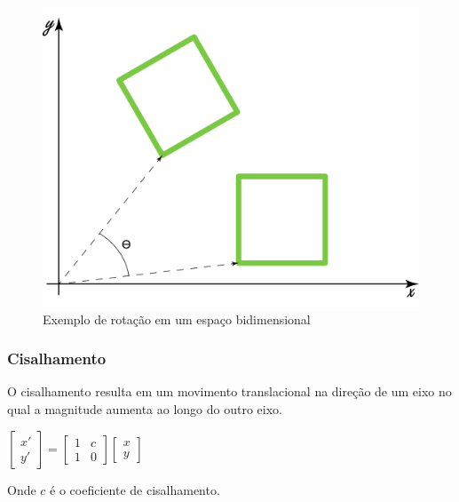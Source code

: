 \documentclass[9pt, a4paper, nofonttune, journal]{IEEEtran}
\begin{document}
\begin{figure}[H] 
\begin{center}
\includegraphics[scale=0.25]{figuras/rotation1.png}
\caption{Exemplo de rotação em um espaço bidimensional}
\end{center}
\end{figure}

\subsubsection{Cisalhamento}
O cisalhamento resulta em um movimento translacional na direção de um eixo no qual a magnitude
aumenta ao longo do outro eixo.

\begin{center}
$\begin{bmatrix}x'\\
y'
\end{bmatrix}=\begin{bmatrix}1 & c\\
1 & 0
\end{bmatrix}\begin{bmatrix}x\\
y
\end{bmatrix}$\end{center}
Onde $c$ é o coeficiente de cisalhamento.\cite{CGPPBook1}
\end{document}
